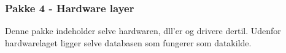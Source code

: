 \documentclass[Main.tex]{subfiles}
\begin{document}
\subsubsection{Pakke 4 - Hardware layer}
Denne pakke indeholder selve hardwaren, dll'er og drivere dertil. Udenfor hardwarelaget ligger selve databasen som fungerer som datakilde. 
\end{document}
